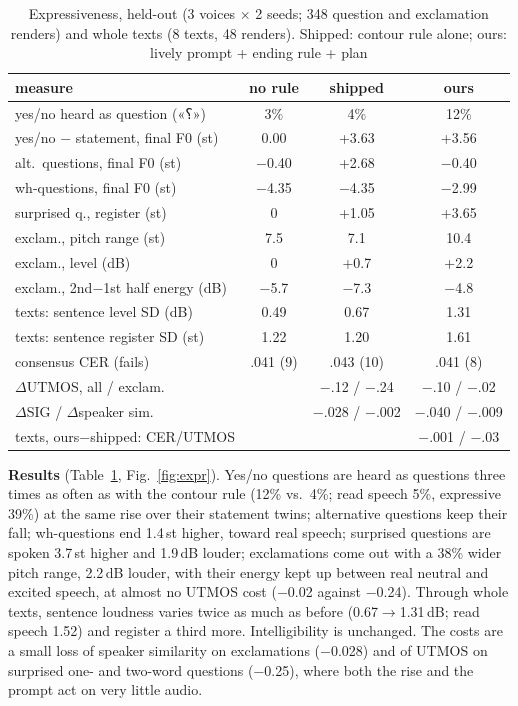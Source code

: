 \documentclass[conference]{IEEEtran}
\newcommand{\fa}[1]{{\persianfont\beginR #1\endR}}
\newcommand{\RES}[1]{#1}
\begin{document}
\begin{table}[t]
\caption{Expressiveness, held-out (3 voices $\times$ 2 seeds; 348 question and exclamation renders) and whole
texts (8 texts, 48 renders). Shipped: contour rule alone; ours: lively prompt + ending rule + plan}\label{tab:expr}
\centering
\footnotesize
\setlength{\tabcolsep}{2.0pt}
\begin{tabular}{lccc}
\toprule
measure & no rule & shipped & ours \\
\midrule
yes/no heard as question (\fa{«؟»}) & \RES{3\%} & \RES{4\%} & \RES{12\%} \\
yes/no $-$ statement, final F0 (st) & \RES{0.00} & \RES{+3.63} & \RES{+3.56} \\
alt.\ questions, final F0 (st) & \RES{$-$0.40} & \RES{+2.68} & \RES{$-$0.40} \\
wh-questions, final F0 (st) & \RES{$-$4.35} & \RES{$-$4.35} & \RES{$-$2.99} \\
surprised q., register (st) & 0 & \RES{+1.05} & \RES{+3.65} \\
exclam., pitch range (st) & \RES{7.5} & \RES{7.1} & \RES{10.4} \\
exclam., level (dB) & 0 & \RES{+0.7} & \RES{+2.2} \\
exclam., 2nd$-$1st half energy (dB) & \RES{$-$5.7} & \RES{$-$7.3} & \RES{$-$4.8} \\
texts: sentence level SD (dB) & \RES{0.49} & \RES{0.67} & \RES{1.31} \\
texts: sentence register SD (st) & \RES{1.22} & \RES{1.20} & \RES{1.61} \\
\midrule
consensus CER (fails) & \RES{.041 (9)} & \RES{.043 (10)} & \RES{.041 (8)} \\
$\Delta$UTMOS, all / exclam. & & \RES{$-$.12 / $-$.24} & \RES{$-$.10 / $-$.02} \\
$\Delta$SIG / $\Delta$speaker sim. & & \RES{$-$.028 / $-$.002} & \RES{$-$.040 / $-$.009} \\
texts, ours$-$shipped: CER/UTMOS & & & \RES{$-$.001 / $-$.03} \\
\bottomrule
\end{tabular}
\end{table}

\textbf{Results} (Table~\ref{tab:expr}, Fig.~\ref{fig:expr}). Yes/no questions are heard as questions three
times as often as with the contour rule (\RES{12\%} vs.\ \RES{4\%}; read speech \RES{5\%}, expressive
\RES{39\%}) at the same rise over their statement twins; alternative questions keep their fall;
wh-questions end \RES{1.4}\,st higher, toward real speech; surprised questions are spoken \RES{3.7}\,st higher
and \RES{1.9}\,dB louder; exclamations come out with a \RES{38\%} wider pitch range, \RES{2.2}\,dB louder,
with their energy kept up between real neutral and excited speech, at almost no UTMOS cost (\RES{$-$0.02}
against \RES{$-$0.24}). Through whole texts, sentence loudness varies twice as much as before
(\RES{0.67$\to$1.31}\,dB; read speech \RES{1.52}) and register a third more. Intelligibility is unchanged. The
costs are a small loss of speaker similarity on exclamations (\RES{$-$0.028}) and of UTMOS on surprised one-
and two-word questions (\RES{$-$0.25}), where both the rise and the prompt act on very little audio.
\end{document}

